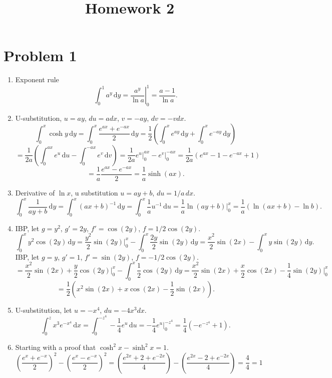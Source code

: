 \documentclass[11pt, letterpaper]{article}
\title{Homework 2}
\begin{document}
\makeproblem
\section*{Problem 1}
\begin{enumerate}
	\item Exponent rule
		\[
			\int_{0}^{1} a^y \,\mathrm{d} y= \left.\frac{a^y}{\ln a}  \right|_0^1 = \frac{a-1}{\ln a} 
		.\]
	\item U-substitution, $u=ay$, $du=adx$, $v=-ay$, $dv=-vdx$.
		\[
			\int_{0}^{x} \cosh y \,\mathrm{d} y=\int_{0}^{x} \frac{e^{ax} +e^{-ax} }{2}  \,\mathrm{d} y= \frac{1}{2} \left( \int_{0}^{x} e^{ay}  \,\mathrm{d} y+\int_{0}^{x} e^{-ay}  \,\mathrm{d} y \right)
		\]
		\[
			=\frac{1}{2a} \left( \int_{0}^{ax} e^u \,\mathrm{d} u-\int_{0}^{-ax} e^v \,\mathrm{d} v \right) =\frac{1}{2a} \left.e^u\right|_{0}^{ax}-\left. e^{v}\right|_0^{-ax} = \frac{1}{2a} \left( e^{ax} -1-e^{-ax} +1 \right) 
		\]
		\[
			=\frac{1}{a} \frac{e^{ax} -e^{-ax} }{2} =\frac{1}{a} \sinh(ax)
		.\]
	\item Derivative of $\ln x$, u substitution $u=ay+b$, $du=1/a\,dx$.
		\[
			\int_{0}^{x} \frac{1}{ay+b}  \,\mathrm{d} y= \int_{0}^{x} \left( ax+b \right) ^{-1}  \,\mathrm{d} y=\int_{0}^{x} \frac{1}{a} u^{-1}  \,\mathrm{d} u= \frac{1}{a} \ln(ay+b) \bigg|_0^x = \frac{1}{a} \left( \ln (ax+b)-\ln b \right) 
		.\]
	\item IBP, let $g=y^2$, $g'=2y$, $f'=\cos (2y)$, $f=1/2 \cos (2y)$.
		\[
			\int_{0}^{x} y^2 \cos (2y) \,\mathrm{d} y=\frac{y^2}{2} \sin (2y)\bigg|_0^x -\int_{0}^{x} \frac{2y}{2} \sin (2y) \,\mathrm{d} y =\frac{x^2}{2} \sin (2x) -\int_{0}^{x} y \sin (2y) \,\mathrm{d} y
		.\]
		IBP, let $g=y$, $g'=1$, $f'=\sin (2y)$, $f=-1/2 \cos (2y)$.
		\[
			=\frac{x^2}{2} \sin (2x)+\frac{y}{2} \cos (2y)\bigg|_0^x-\int_{0}^{x} \frac{1}{2} \cos (2y) \,\mathrm{d} y=\frac{x^2}{2} \sin (2x)+\frac{x}{2} \cos (2x)-\frac{1}{4} \sin (2y)\bigg|_0^x
		\]
		\[
			=\frac{1}{2} \left( x^2 \sin (2x)+ x \cos (2x)- \frac{1}{2} \sin (2x) \right) 
		.\]
	\item U-substitution, let $u=-x^4$, $du=-4x^3 dx$.
		\[
			\int_{0}^{z} x^3e^{-x^4}  \,\mathrm{d} x=\int_{0}^{-z^4} -\frac{1}{4} e^u \,\mathrm{d} u=-\frac{1}{4} e^u \bigg|_0^{-z^4}=\frac{1}{4} \left(-e^{-z^4} +1\right)
		.\]
	\item Starting with a proof that $\cosh^2 x-\sinh^2 x=1$.
		\[
			\left( \frac{e^{x} +e^{-x} }{2}  \right)^2-\left( \frac{e^{x} -e^{-x} }{2}  \right) ^2=\left( \frac{e^{2x} +2+e^{-2x} }{4}  \right) -\left( \frac{e^{2x} -2+e^{-2x} }{4}  \right) =\frac{4}{4} =1
\]
\end{enumerate}
\end{document}
